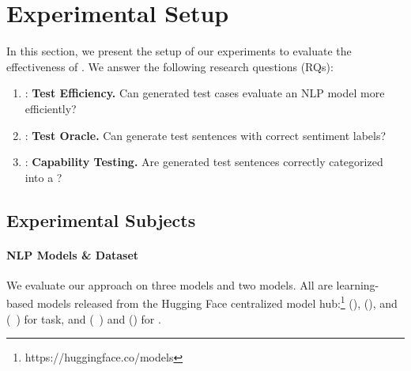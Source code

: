 \section{Experimental Setup}
\label{sec:experiment}
%
In this section, we present the setup of our experiments to evaluate
the effectiveness of \tool. We answer the following research
questions (RQs):

\begin{enumerate}[label=\textbf{RQ\arabic*}]
\item \label{rq:three}: \textbf{Test Efficiency.} Can \tool generated test cases evaluate an NLP model more efficiently?
\item \label{rq:one}: \textbf{Test Oracle.}  Can \tool generate test sentences with correct sentiment labels?
\item \label{rq:two}: \textbf{Capability Testing.} Are \tool generated test sentences correctly categorized into a \lc?
\end{enumerate}


\subsection{Experimental Subjects}
\paragraph*{\textbf{NLP Models \& Dataset}}
We evaluate our approach on three \sa models and two \hsd models. All
are learning-based models released from the Hugging Face centralized
model hub:\footnote{https://huggingface.co/models} \texttt{\Bert}
(\bertsamodel), \texttt{\Roberta} (\robertasamodel), and
\texttt{\Dbert} (\disbertsamodel~\cite{sanh2019distilbertad}) for \sa
task, and \texttt{\hsdBert} (\berthsdmodel~\cite{aluru2020deep}) and
\texttt{\hsdRoBerta} (\robertahsdmodel) for \hsd.

